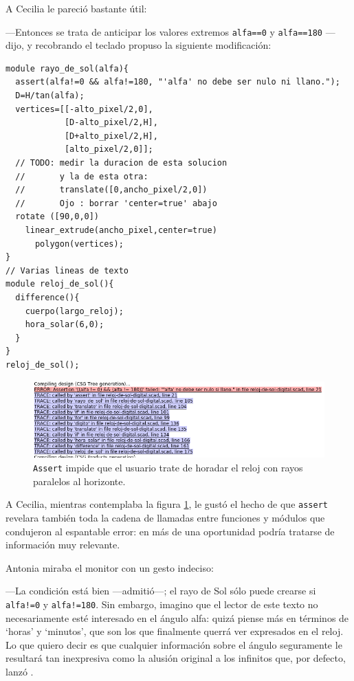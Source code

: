 A Cecilia le pareció bastante útil:

---Entonces se trata de anticipar los valores extremos
\lstinline!alfa==0! y \lstinline!alfa==180! ---dijo, y recobrando el
teclado propuso la siguiente modificación:

\begin{lstlisting}
module rayo_de_sol(alfa){
  assert(alfa!=0 && alfa!=180, "'alfa' no debe ser nulo ni llano.");
  D=H/tan(alfa);
  vertices=[[-alto_pixel/2,0],
            [D-alto_pixel/2,H],
            [D+alto_pixel/2,H],
            [alto_pixel/2,0]];
  // TODO: medir la duracion de esta solucion
  //       y la de esta otra:
  //       translate([0,ancho_pixel/2,0])
  //       Ojo : borrar 'center=true' abajo
  rotate ([90,0,0])
    linear_extrude(ancho_pixel,center=true)
      polygon(vertices);
}
// Varias lineas de texto
module reloj_de_sol(){
  difference(){
    cuerpo(largo_reloj);
    hora_solar(6,0);
  }
}
reloj_de_sol();
\end{lstlisting}%


\begin{figure}[ht]
  \centering
  \includegraphics[width=1\textwidth]{imagenes/assert-2}  
  \caption{\texttt{Assert} impide que el usuario trate de horadar el reloj con
    rayos paralelos al horizonte.}
\label{fig:assert-2}
\end{figure}


A Cecilia, mientras contemplaba la figura \ref{fig:assert-2}, le gustó
el hecho de que \lstinline!assert! revelara también toda la cadena de
llamadas entre funciones y módulos que condujeron al espantable error:
en más de una oportunidad podría tratarse de información muy
relevante.

Antonia miraba el monitor con un gesto indeciso:

---La condición está bien ---admitió---; el rayo de Sol sólo puede
crearse si \texttt{alfa!=0} y \texttt{alfa!=180}.  Sin embargo,
imagino que el lector de este texto no necesariamente esté interesado
en el ángulo alfa: quizá piense más en términos de `horas' y
`minutos', que son los que finalmente querrá ver expresados en el
reloj. Lo que quiero decir es que cualquier información sobre el
ángulo seguramente le resultará tan inexpresiva como la alusión
original a los infinitos que, por defecto, lanzó \openscad.

